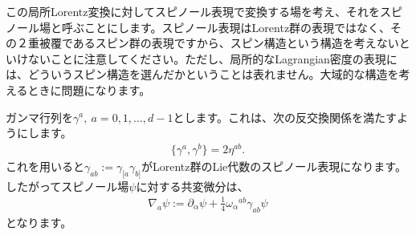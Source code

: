 \documentclass[report,paper=a4, fontsize=12pt, line_length=16cm, number_of_lines=33,dvipdfmx]{jlreq}
\numberwithin{equation}{chapter}
\numberwithin{equation}{section}
\newcommand{\del}{\partial}
\begin{document}
この局所Lorentz変換に対してスピノール表現で変換する場を考え、それをスピノール場と呼ぶことにします。スピノール表現はLorentz群の表現ではなく、その２重被覆であるスピン群の表現ですから、スピン構造という構造を考えないといけないことに注意してください。ただし、局所的なLagrangian密度の表現には、どういうスピン構造を選んだかということは表れません。大域的な構造を考えるときに問題になります。

ガンマ行列を$\gamma^{a},\ a=0,1,\dots,d-1$とします。これは、次の反交換関係を満たすようにします。
\begin{align}
  \{\gamma^{a},\gamma^{b}\}=2\eta^{ab}.
\end{align}
これを用いると$\gamma_{ab}:=\gamma_{[a}\gamma_{b]}$がLorentz群のLie代数のスピノール表現になります。したがってスピノール場$\psi$に対する共変微分は、
\begin{align}
  \nabla_{a}\psi:=\del_{\alpha}\psi+\frac14\omega_{\alpha}{}^{ab}\gamma_{ab}\psi
\end{align}
となります。
\end{document}
